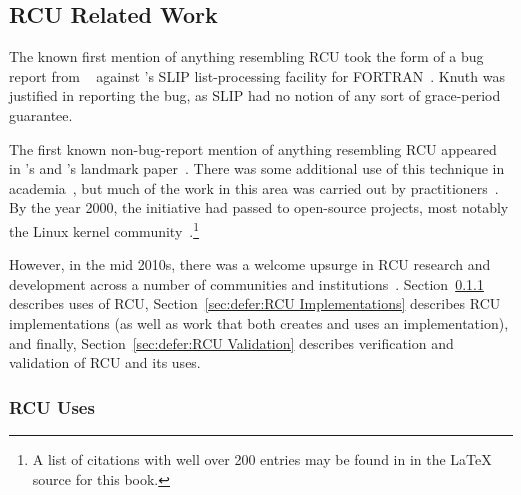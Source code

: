 
\subsection{RCU Related Work}
\label{sec:defer:RCU Related Work}

The known first mention of anything resembling RCU took the form of a bug
report from
~\cite[page 413 of Fundamental Algorithms]{Knuth73}
against 's SLIP list-processing facility for
FORTRAN~\cite{Weizenbaum:1963:SLP:367593.367617}.
Knuth was justified in reporting the bug, as SLIP had no notion of
any sort of grace-period guarantee.

The first known non-bug-report mention of anything resembling RCU appeared
in 's and 's landmark
paper~\cite{Kung80}.
There was some additional use of this technique in
academia~\cite{Manber82,Manber84,BarbaraLiskov1988ArgusCACM,Pugh90,Andrews91textbook,Pu95a,Cowan96a,Rastogi:1997:LPV:645923.671017,Gamsa99},
but much of the work in this area was carried out by
practitioners~\cite{RichardRashid87a,Hennessy89,Jacobson93,AjuJohn95,Slingwine95,Slingwine97,Slingwine98,McKenney98}.
By the year 2000, the initiative had passed to open-source projects,
most notably the Linux kernel
community~\cite{RustyRussell2000a,RustyRussell2000b,McKenney01b,McKenney01a,McKenney02a,Arcangeli03}.\footnote{
	A list of citations with well over 200 entries may be found in
	 in the {\LaTeX} source for this book.}

However, in the mid 2010s, there was a welcome upsurge in RCU research
and development across a number of communities and
institutions~\cite{FransKaashoek2015ParallelOSHistory}.
Section~\ref{sec:defer:RCU Uses} describes uses of RCU,
Section~\ref{sec:defer:RCU Implementations} describes RCU implementations
(as well as work that both creates and uses an implementation),
and finally,
Section~\ref{sec:defer:RCU Validation} describes verification and validation
of RCU and its uses.

\subsubsection{RCU Uses}
\label{sec:defer:RCU Uses}

